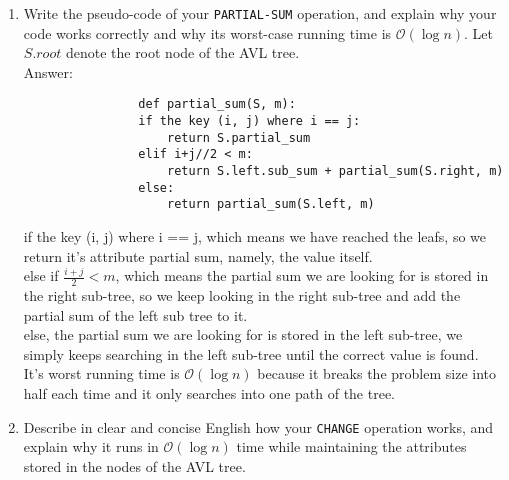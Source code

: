 \documentclass{assignment-263}
\begin{document}
\begin{enumerate}
\begin{enumerate}
			\item Write the pseudo-code of your \texttt{PARTIAL-SUM}
				operation, and explain why your code works correctly and why
				its worst-case running time is $\mathcal{O}(\log n)$. Let
				$S.\textit{root}$ denote the root node of the AVL tree.\\
				Answer:
				\begin{verbatim}
				def partial_sum(S, m):
                if the key (i, j) where i == j: 
                    return S.partial_sum
                elif i+j//2 < m:
                    return S.left.sub_sum + partial_sum(S.right, m)
                else:
                    return partial_sum(S.left, m)
				\end{verbatim}
				if the key (i, j) where i == j, which means we have reached the leafs, so we return it's attribute partial sum, namely, the value itself.\\
				else if $\frac{i+j}{2} < m$, which means the partial sum we are looking for is stored in the right sub-tree, so we keep looking in the right sub-tree and add the partial sum of the left sub tree to it.\\
				else, the partial sum we are looking for is stored in the left sub-tree, we simply keeps searching in the left sub-tree until the correct value is found.\\
				It's worst running time is 	$\mathcal{O}(\log n)$ because it breaks the problem size into half each time and it only searches into one path of the tree.
				
\newpage
			\item Describe in clear and concise English how your
				\texttt{CHANGE} operation works, and explain why it runs in
				$\mathcal{O}(\log n)$ time while maintaining the attributes
				stored in the nodes of the AVL tree.\\
				

\end{enumerate}
\end{enumerate}
\end{document}
